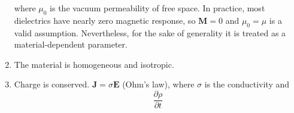 \begin{enumerate}
        where $\mu_0$ is the vacuum permeability of free space.  In practice, most
        dielectrics have nearly zero magnetic response, so $\mathbf{M}=0$ and
        $\mu_0=\mu$ is a valid assumption.  Nevertheless, for the sake of generality it is treated as a
        material-dependent parameter.
  \item The material is homogeneous and isotropic.
  \item Charge is conserved.  $\mathbf{J} = \sigma \mathbf{E}$ (Ohm's law), where
        $\sigma$ is the conductivity and
        \begin{equation}
          \frac{\partial \rho}{\partial t}
        \end{equation}
\end{enumerate}
